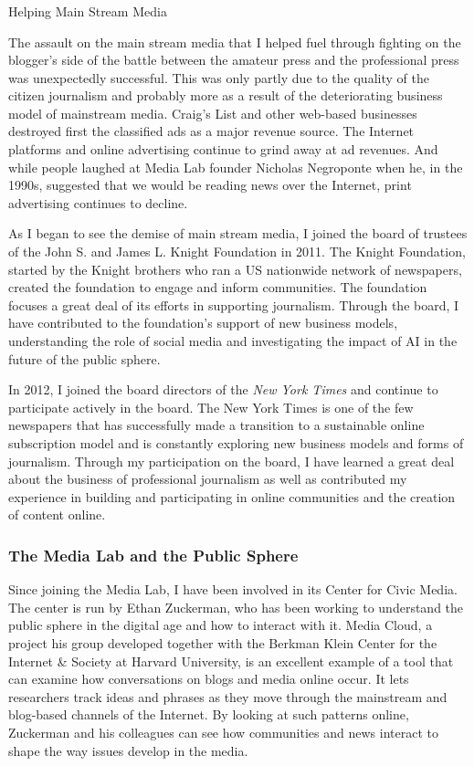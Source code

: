 \subsubsection{}{Helping Main Stream Media}

The assault on the main stream media that I helped fuel through fighting on the blogger's side of the battle between the amateur press and the professional press was unexpectedly successful. This was only partly due to the quality of the citizen journalism and probably more as a result of the deteriorating business model of mainstream media. Craig's List and other web-based businesses destroyed first the classified ads as a major revenue source. The Internet platforms and online advertising continue to grind away at ad revenues. And while people laughed at Media Lab founder Nicholas Negroponte when he, in the 1990s, suggested that we would be reading news over the Internet, print advertising continues to decline.

As I began to see the demise of main stream media, I joined the board of trustees of the John S. and James L. Knight Foundation in 2011. The Knight Foundation, started by the Knight brothers who ran a US nationwide network of newspapers, created the foundation to engage and inform communities. The foundation focuses a great deal of its efforts in supporting journalism. Through the board, I have contributed to the foundation's support of new business models, understanding the role of social media and investigating the impact of \ac{AI} in the future of the public sphere.

In 2012, I joined the board directors of the \textit{New York Times} and continue to participate actively in the board. The New York Times is one of the few newspapers that has successfully made a transition to a sustainable online subscription model and is constantly exploring new business models and forms of journalism. Through my participation on the board, I have learned a great deal about the business of professional journalism as well as contributed my experience in building and participating in online communities and the creation of content online.

\subsubsection{The Media Lab and the Public Sphere}

Since joining the Media Lab, I have been involved in its Center for Civic Media. The center is run by Ethan Zuckerman, who has been working to understand the public sphere in the digital age and how to interact with it. Media Cloud, a project his group developed together with the Berkman Klein Center for the Internet \& Society at Harvard University, is an excellent example of a tool that can examine how conversations on blogs and media online occur. It lets researchers track ideas and phrases as they move through the mainstream and blog-based channels of the Internet. By looking at such patterns online, Zuckerman and his colleagues can see how communities and news interact to shape the way issues develop in the media.

